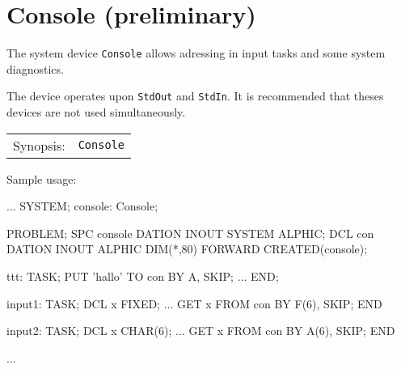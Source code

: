 

\section{Console (preliminary)}
The system device \verb|Console| allows adressing in input tasks
and some system diagnostics.

The device operates upon \verb|StdOut| and \verb|StdIn|. 
It is recommended that theses devices are not used simultaneously.

\begin{tabular}{ll}
Synopsis: & \verb|Console| \\
\end{tabular}

Sample usage:
\begin{PEARLCode}
...
SYSTEM;
  console: Console;

PROBLEM;
   SPC console DATION INOUT SYSTEM ALPHIC;
   DCL con     DATION INOUT ALPHIC DIM(*,80) FORWARD  CREATED(console);

ttt: TASK;
   PUT 'hallo' TO con BY A, SKIP;
...
END;

input1: TASK;
   DCL x FIXED;
   ...
   GET x FROM con BY F(6), SKIP;
END

input2: TASK;
   DCL x CHAR(6);
   ...
   GET x FROM con BY A(6), SKIP;
END

...
\end{PEARLCode}


